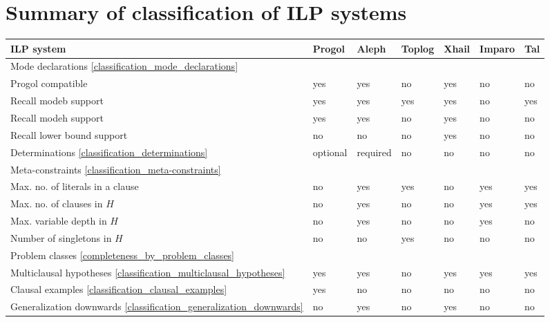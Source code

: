 \section{Summary of classification of ILP systems}\label{classification_summary}
\begin{center}
 \begin{tabular}{| l | l | l | l | l | l | l |}
    \hline
    ILP system & Progol & Aleph & Toplog & Xhail & Imparo & Tal \\ \hline
    \hline
    \multicolumn{7}{|l|}{Mode declarations \ref{classification_mode_declarations}} \\ \hline
    Progol compatible & yes & yes & no &  yes & no & no \\ \hline
    Recall modeb support & yes & yes & yes & yes & no & yes \\ \hline
    Recall modeh support & yes & yes & no & yes & no & no \\ \hline
    Recall lower bound support & no & no & no & yes & no & no \\ \hline
    \hline
    Determinations \ref{classification_determinations} & optional & required & no & no & no & no \\ \hline
    \hline
    \multicolumn{7}{|l|}{Meta-constraints \ref{classification_meta-constraints}} \\ \hline
    Max. no. of literals in a clause & no & yes & yes & no & yes & yes\\ \hline
    Max. no. of clauses in $H$ & no & yes & no & no & yes & yes\\ \hline
    Max. variable depth in $H$ & no & yes & no & no & yes & no\\ \hline
    Number of singletons in $H$ & no & no & yes & no & no & no\\ \hline    
    \hline
    
    \multicolumn{7}{|l|}{Problem classes \ref{completeness_by_problem_classes}} \\ \hline
    Multiclausal hypotheses \ref{classification_multiclausal_hypotheses}& yes & yes & no & 
    yes & yes & yes \\ \hline
    
        \hline
    Clausal examples \ref{classification_clausal_examples}& yes & no & no & 
    no & no & no \\ \hline        
  	
  	Generalization downwards \ref{classification_generalization_downwards}
    & no & yes & no & yes & no & no \\ \hline


\end{tabular}
\end{center}
